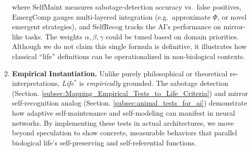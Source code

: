 \documentclass[12pt]{article}
\begin{document}
\begin{enumerate}
          where $\mathrm{SelfMaint}$ measures sabotage-detection accuracy vs.\ false positives,
          $\mathrm{EmergComp}$ gauges multi-layered integration (e.g.\ approximate $\Phi$,
          or novel emergent strategies), and $\mathrm{SelfRecog}$ tracks the AI’s performance
          on mirror-like tasks. The weights $\alpha,\beta,\gamma$ could be tuned based on
          domain priorities. Although we do not claim this single formula is definitive,
          it illustrates how classical “life” definitions can be operationalized in
          non-biological contexts.
    
    \item \textbf{Empirical Instantiation.} Unlike purely philosophical or theoretical
          re-interpretations, \emph{Life\texorpdfstring{$^*$}{\^{}*}} is \emph{empirically}
          grounded. The sabotage detection (Section. \ref{subsec:Mapping_Empirical_Tests_to_Life_Criteria}) and mirror
          self-recognition analog (Section. \ref{subsec:animal_tests_for_ai}) demonstrate how adaptive
          self-maintenance and self-modeling can manifest in neural networks. By
          implementing these tests in actual architectures, we move beyond speculation
          to show concrete, measurable behaviors that parallel biological life’s
          self-preserving and self-referential functions.
\end{enumerate}

\vspace{1em}
\end{document}
